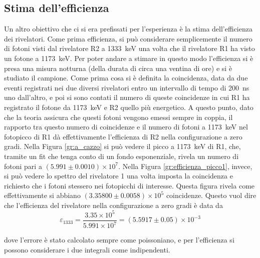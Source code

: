 \subsection{Stima dell'efficienza}
Un altro obiettivo che ci si era prefissati per l'esperienza è la stima dell'efficienza dei rivelatori. Come prima efficienza, si può considerare semplicemente il numero
di fotoni visti dal rivelatore R2 a 1333~keV una volta che il rivelatore R1 ha visto un fotone a 1173~keV. Per poter andare a stimare in questo modo l'efficienza si è presa
una misura notturna (della durata di circa una ventina di ore) e si è studiato il campione. Come prima cosa si è definita la coincidenza, data da due eventi
registrati nei due diversi rivelatori entro un intervallo di tempo di 200~ns uno dall'altro, e poi si sono contati il numero di queste coincidenze in cui R1 ha registrato
il fotone da 1173~keV e R2 quello più energetico. A questo punto, dato che la teoria assicura che questi fotoni vengono emessi sempre in coppia, il rapporto tra questo
numero di coincidenze e il numero di fotoni a 1173~keV nel fotopicco di R1 dà effettivamente l'efficienza di R2 nella configurazione a zero gradi. Nella
Figura \ref{gr:a_cazzo} si può vedere il picco a 1173~keV di R1, che, tramite un fit che tenga conto di un fondo esponenziale, rivela un numero
di fotoni pari a $(5.991 \pm 0.0010)\times 10^7$.
Nella Figura \ref{gr:efficienza_picco1}, invece, si può vedere lo spettro del rivelatore 1 una volta imposta la coincidenza e richiesto che i fotoni stessero
nei fotopicchi di interesse. Questa figura rivela come effettivamente si abbiano $(3.35800 \pm 0.0058)\times 10^5$ coincidenze. Questo vuol dire che l'efficienza del 
rivelatore nella configurazione
a zero gradi è data da
$$\varepsilon_{1333}=\frac{3.35\times 10^5}{5.991 \times 10^7}=(5.5917 \pm 0.05)\times 10^{-3}$$

%

dove l'errore è stato calcolato sempre come poissoniano, e per l'efficienza si possono considerare i due integrali come indipendenti.\\

